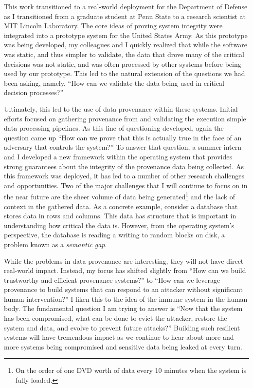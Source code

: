 This work transitioned to a real-world deployment for the Department of Defense as I transitioned from a graduate student at Penn State to a research scientist at MIT Lincoln Laboratory. The core ideas of proving system integrity were integrated into a prototype system for the United States Army. As this prototype was being developed, my colleagues and I quickly realized that while the software was static, and thus simpler to validate, the data that drove many of the critical decisions was not static, and was often processed by other systems before being used by our prototype. This led to the natural extension of the questions we had been asking, namely, ``How can we validate the data being used in critical decision processes?''

Ultimately, this led to the use of data provenance within these systems. Initial efforts focused on gathering provenance from and validating the execution simple data processing pipelines. As this line of questioning developed, again the question came up ``How can we prove that this is actually true in the face of an adversary that controls the system?'' To answer that question, a summer intern and I developed a new framework within the operating system that provides strong guarantees about the integrity of the provenance data being collected. As this framework was deployed, it has led to a number of other research challenges and opportunities. Two of the major challenges that I will continue to focus on in the near future are the sheer volume of data being generated\footnote{On the order of one DVD worth of data every 10 minutes when the system is fully loaded.} and the lack of context in the gathered data. As a concrete example, consider a database that stores data in rows and columns. This data has structure that is important in understanding how critical the data is. However, from the operating system's perspective, the database is reading a writing to random blocks on disk, a problem known as a \emph{semantic gap}.

While the problems in data provenance are interesting, they will not have direct real-world impact. Instead, my focus has shifted slightly from ``How can we build trustworthy and efficient provenance systems?'' to ``How can we leverage provenance to build systems that can respond to an attacker without significant human intervention?'' I liken this to the idea of the immune system in the human body. The fundamental question I am trying to answer is ``Now that the system has been compromised, what can be done to evict the attacker, restore the system and data, and evolve to prevent future attacks?'' Building such resilient systems will have tremendous impact as we continue to hear about more and more systems being compromised and sensitive data being leaked at every turn.